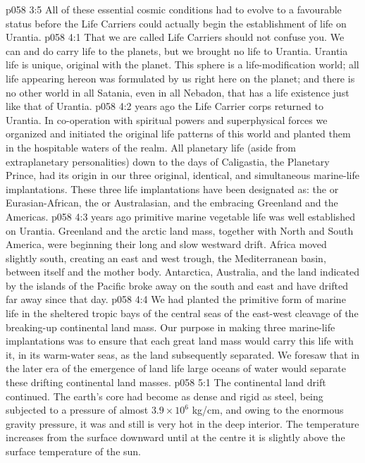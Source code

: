 \vs p058 3:5 \pc All of these essential cosmic conditions had to evolve to a favourable status before the Life Carriers could actually begin the establishment of life on Urantia.
\vs p058 4:1 That we are called Life Carriers should not confuse you. We can and do carry life to the planets, but we brought no life to Urantia. Urantia life is unique, original with the planet. This sphere is a life\hyp{}modification world; all life appearing hereon was formulated by us right here on the planet; and there is no other world in all Satania, even in all Nebadon, that has a life existence just like that of Urantia.
\vs p058 4:2 \pc {} years ago the Life Carrier corps returned to Urantia. In co\hyp{}operation with spiritual powers and superphysical forces we organized and initiated the original life patterns of this world and planted them in the hospitable waters of the realm. All planetary life (aside from extraplanetary personalities) down to the days of Caligastia, the Planetary Prince, had its origin in our three original, identical, and simultaneous marine\hyp{}life implantations. These three life implantations have been designated as: the  or Eurasian\hyp{}African, the  or Australasian, and the  embracing Greenland and the Americas.
\vs p058 4:3 \pc {} years ago primitive marine vegetable life was well established on Urantia. Greenland and the arctic land mass, together with North and South America, were beginning their long and slow westward drift. Africa moved slightly south, creating an east and west trough, the Mediterranean basin, between itself and the mother body. Antarctica, Australia, and the land indicated by the islands of the Pacific broke away on the south and east and have drifted far away since that day.
\vs p058 4:4 We had planted the primitive form of marine life in the sheltered tropic bays of the central seas of the east\hyp{}west cleavage of the breaking\hyp{}up continental land mass. Our purpose in making three marine\hyp{}life implantations was to ensure that each great land mass would carry this life with it, in its warm\hyp{}water seas, as the land subsequently separated. We foresaw that in the later era of the emergence of land life large oceans of water would separate these drifting continental land masses.
\vs p058 5:1 The continental land drift continued. The earth’s core had become as dense and rigid as steel, being subjected to a pressure of almost $3.9 \times 10^{6}$ kg/cm, and owing to the enormous gravity pressure, it was and still is very hot in the deep interior. The temperature increases from the surface downward until at the centre it is slightly above the surface temperature of the sun.
